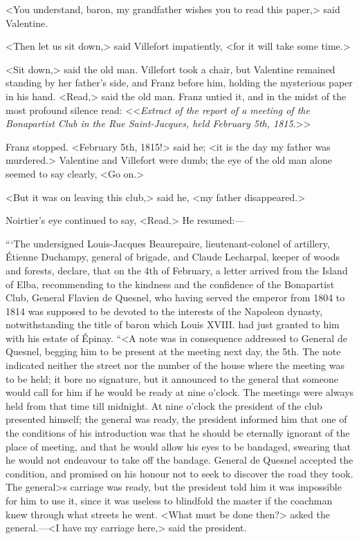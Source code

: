  <You understand, baron, my grandfather wishes you to read this paper,> said Valentine. 

 <Then let us sit down,> said Villefort impatiently, <for it will take some time.> 

 <Sit down,> said the old man. Villefort took a chair, but Valentine remained standing by her father's side, and Franz before him, holding the mysterious paper in his hand. <Read,> said the old man. Franz untied it, and in the midst of the most profound silence read:  <<\textit{Extract of the report of a meeting of the Bonapartist Club in the Rue Saint-Jacques, held February 5th, 1815}.>> 

 Franz stopped. <February 5th, 1815!> said he; <it is the day my father was murdered.> Valentine and Villefort were dumb; the eye of the old man alone seemed to say clearly, <Go on.> 

 <But it was on leaving this club,> said he, <my father disappeared.> 

 Noirtier's eye continued to say, <Read.> He resumed:— 

 “‘The undersigned Louis-Jacques Beaurepaire, lieutenant-colonel of artillery, Étienne Duchampy, general of brigade, and Claude Lecharpal, keeper of woods and forests, declare, that on the 4th of February, a letter arrived from the Island of Elba, recommending to the kindness and the confidence of the Bonapartist Club, General Flavien de Quesnel, who having served the emperor from 1804 to 1814 was supposed to be devoted to the interests of the Napoleon dynasty, notwithstanding the title of baron which Louis XVIII. had just granted to him with his estate of Épinay.  “<A note was in consequence addressed to General de Quesnel, begging him to be present at the meeting next day, the 5th. The note indicated neither the street nor the number of the house where the meeting was to be held; it bore no signature, but it announced to the general that someone would call for him if he would be ready at nine o'clock. The meetings were always held from that time till midnight. At nine o'clock the president of the club presented himself; the general was ready, the president informed him that one of the conditions of his introduction was that he should be eternally ignorant of the place of meeting, and that he would allow his eyes to be bandaged, swearing that he would not endeavour to take off the bandage. General de Quesnel accepted the condition, and promised on his honour not to seek to discover the road they took. The general>s carriage was ready, but the president told him it was impossible for him to use it, since it was useless to blindfold the master if the coachman knew through what streets he went. <What must be done then?> asked the general.—<I have my carriage here,> said the president. 

